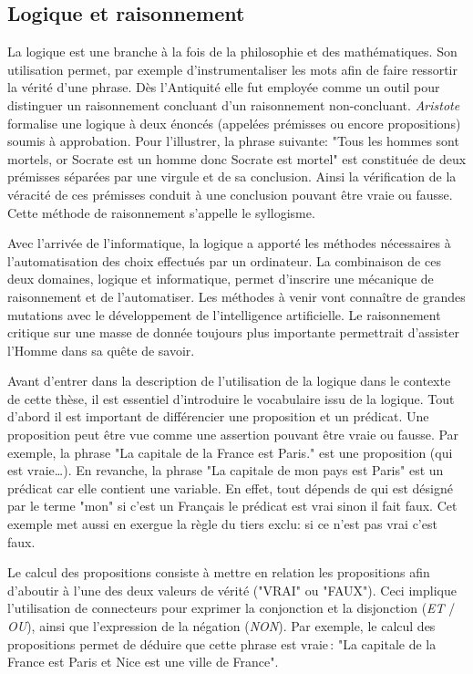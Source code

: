 \begin{refsegment}
    \subsection{Logique et raisonnement}
    
    La logique est une branche à la fois de la philosophie et des mathématiques. Son utilisation permet, par exemple d'instrumentaliser les mots afin de faire ressortir la vérité d'une phrase. Dès l'Antiquité elle fut employée comme un outil pour distinguer un raisonnement concluant d'un raisonnement non-concluant. \textit{Aristote} formalise une logique à deux énoncés (appelées prémisses ou encore propositions) soumis à approbation. Pour l'illustrer, la phrase suivante: "Tous les hommes sont mortels, or Socrate est un homme donc Socrate est mortel" est constituée de deux prémisses séparées par une virgule et de sa conclusion. Ainsi la vérification de la véracité de ces prémisses conduit à une conclusion pouvant être vraie ou fausse. Cette méthode de raisonnement s'appelle le syllogisme.
    
    Avec l'arrivée de l'informatique, la logique a apporté les méthodes nécessaires à l'automatisation des choix effectués par un ordinateur. La combinaison de ces deux domaines, logique et informatique, permet d'inscrire une mécanique de raisonnement et de l'automatiser. Les méthodes à venir vont connaître de grandes mutations avec le développement de l'intelligence artificielle. Le raisonnement critique sur une masse de donnée toujours plus importante permettrait d'assister l'Homme dans sa quête de savoir.
    
    
    Avant d’entrer dans la description de l’utilisation de la logique dans le contexte de cette thèse, il est essentiel d'introduire le vocabulaire issu de la logique. Tout d'abord il est important de différencier une proposition et un prédicat.  Une proposition peut être vue comme une assertion pouvant être vraie ou fausse. Par exemple, la phrase "La capitale de la France est Paris." est une proposition (qui est vraie\ldots). En revanche, la phrase "La capitale de mon pays est Paris" est un prédicat car elle contient une variable. En effet, tout dépends de qui est désigné par le terme "mon" si c'est un Français le prédicat est vrai sinon il fait faux. Cet exemple met aussi en exergue la règle du tiers exclu: si ce n'est pas vrai c'est faux.
    
    Le calcul des propositions consiste à mettre en relation les propositions afin d'aboutir à l'une des deux valeurs de vérité ("VRAI" ou "FAUX"). Ceci implique l'utilisation de connecteurs pour exprimer la conjonction et la disjonction (\textit{ET} / \textit{OU}), ainsi que l'expression de la négation (\textit{NON}). Par exemple, le calcul des propositions permet de déduire que cette phrase est vraie : "La capitale de la France est Paris et Nice est une ville de France".
    

\end{refsegment}
